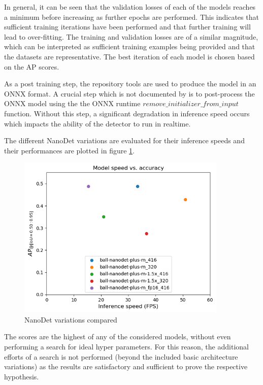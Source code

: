 \documentclass[a4paper,twoside,12pt]{report}
\begin{document}
In general, it can be seen that the validation losses of each of the models reaches a minimum before increasing as further epochs are performed. This indicates that sufficient training iterations have been performed and that further training will lead to over-fitting. The training and validation losses are of a similar magnitude, which can be interpreted as sufficient training examples being provided and that the datasets are representative. The best iteration of each model is chosen based on the AP scores. 

As a post training step, the repository tools are used to produce the model in an ONNX format. A crucial step which is not documented by \cite{nanodet} is to post-process the ONNX model using the the ONNX runtime $remove\_initializer\_from\_input$ function. Without this step, a significant degradation in inference speed occurs which impacts the ability of the detector to run in realtime.

The different NanoDet variations are evaluated for their inference speeds and their performances are plotted in figure \ref{fig:nanodet_compare}.

\begin{figure}[h!]
\begin{center}
\includegraphics[width=10cm]{images/nanodet_compare.png}
\caption{NanoDet variations compared}
\label{fig:nanodet_compare}
\end{center}
\end{figure}

The scores are the highest of any of the considered models, without even performing a search for ideal hyper parameters. For this reason, the additional efforts of a search is not performed (beyond the included basic architecture variations) as the results are satisfactory and sufficient to prove the respective hypothesis. 
\end{document}
